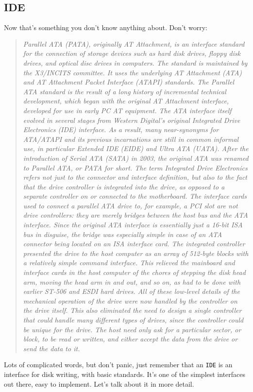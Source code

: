 \documentclass{42-en}
\begin{document}
    \subsection{IDE}
    Now that's something you don't know anything about. Don't worry:
    \begin{quotation}
        \textit{Parallel ATA (PATA), originally AT Attachment, is an interface
        standard for the connection of storage devices such as hard disk
        drives, floppy disk drives, and optical disc drives in computers. The
        standard is maintained by the X3/INCITS committee. It uses the
        underlying AT Attachment (ATA) and AT Attachment Packet Interface
        (ATAPI) standards.
        The Parallel ATA standard is the result of a long history of
        incremental technical development, which began with the original AT
        Attachment interface, developed for use in early PC AT equipment. The
        ATA interface itself evolved in several stages from Western Digital's
        original Integrated Drive Electronics (IDE) interface. As a result,
        many near-synonyms for ATA/ATAPI and its previous incarnations are
        still in common informal use, in particular Extended IDE (EIDE) and
        Ultra ATA (UATA). After the introduction of Serial ATA (SATA) in 2003,
        the original ATA was renamed to Parallel ATA, or PATA for short.
        The term Integrated Drive Electronics refers not just to the connector
        and interface definition, but also to the fact that the drive
        controller is integrated into the drive, as opposed to a separate
        controller on or connected to the motherboard. The interface cards used
        to connect a parallel ATA drive to, for example, a PCI slot are not
        drive controllers: they are merely bridges between the host bus and the
        ATA interface. Since the original ATA interface is essentially just a
        16-bit ISA bus in disguise, the bridge was especially simple in case of
        an ATA connector being located on an ISA interface card. The integrated
        controller presented the drive to the host computer as an array of
        512-byte blocks with a relatively simple command interface. This
        relieved the mainboard and interface cards in the host computer of the
        chores of stepping the disk head arm, moving the head arm in and out,
        and so on, as had to be done with earlier ST-506 and ESDI hard drives.
        All of these low-level details of the mechanical operation of the drive
        were now handled by the controller on the drive itself. This also
        eliminated the need to design a single controller that could handle
        many different types of drives, since the controller could be unique
        for the drive. The host need only ask for a particular sector, or
        block, to be read or written, and either accept the data from the drive
        or send the data to it.}
    \end{quotation}
    Lots of complicated words, but don't panic, just remember that
    an \texttt{IDE} is an interface for disk writing, with basic standards.
    It's one of the simplest interfaces out there, easy to implement.
    Let's talk about it in more detail.
\end{document}

